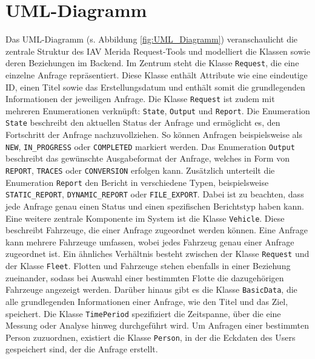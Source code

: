 \section{UML-Diagramm}
Das UML-Diagramm (s. Abbildung \ref{fig:UML_Diagramm}) veranschaulicht die zentrale Struktur des IAV Merida Request-Tools und modelliert die Klassen sowie deren Beziehungen im Backend. Im Zentrum steht die Klasse \texttt{Request}, die eine einzelne Anfrage repräsentiert. Diese Klasse enthält Attribute wie eine eindeutige ID, einen Titel sowie das Erstellungsdatum und enthält somit die grundlegenden Informationen der jeweiligen Anfrage.
\newline
Die Klasse \texttt{Request} ist zudem mit mehreren Enumerationen verknüpft: \texttt{State}, \texttt{Output} und \texttt{Report}. Die Enumeration \texttt{State} beschreibt den aktuellen Status der Anfrage und ermöglicht es, den Fortschritt der Anfrage nachzuvollziehen. So können Anfragen beispielsweise als \texttt{NEW}, \texttt{IN\_PROGRESS} oder \texttt{COMPLETED} markiert werden. Das Enumeration \texttt{Output} beschreibt das gewünschte Ausgabeformat der Anfrage, welches in Form von \texttt{REPORT}, \texttt{TRACES} oder \texttt{CONVERSION} erfolgen kann. Zusätzlich unterteilt die Enumeration \texttt{Report} den Bericht in verschiedene Typen, beispielsweise \texttt{STATIC\_REPORT}, \texttt{DYNAMIC\_REPORT} oder \texttt{FILE\_EXPORT}. Dabei ist zu beachten, dass jede Anfrage genau einen Status und einen spezifischen Berichtstyp haben kann.
\newline
Eine weitere zentrale Komponente im System ist die Klasse \texttt{Vehicle}. Diese beschreibt Fahrzeuge, die einer Anfrage zugeordnet werden können. Eine Anfrage kann mehrere Fahrzeuge umfassen, wobei jedes Fahrzeug genau einer Anfrage zugeordnet ist. Ein ähnliches Verhältnis besteht zwischen der Klasse \texttt{Request} und der Klasse \texttt{Fleet}. Flotten und Fahrzeuge stehen ebenfalls in einer Beziehung zueinander, sodass bei Auswahl einer bestimmten Flotte die dazugehörigen Fahrzeuge angezeigt werden.
\newline
Darüber hinaus gibt es die Klasse \texttt{BasicData}, die alle grundlegenden Informationen einer Anfrage, wie den Titel und das Ziel, speichert. Die Klasse \texttt{TimePeriod} spezifiziert die Zeitspanne, über die eine Messung oder Analyse hinweg durchgeführt wird. Um Anfragen einer bestimmten Person zuzuordnen, existiert die Klasse \texttt{Person}, in der die Eckdaten des Users gespeichert sind, der die Anfrage erstellt.
\newline
